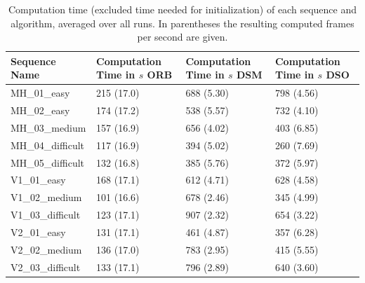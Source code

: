 	\begin{table}
	\caption{Computation time (excluded time needed for initialization) of each sequence and algorithm, averaged over all runs. In parentheses the 
	resulting computed frames per second are given.}
	\begin{tabular}{ |p{3cm}||p{3cm}|p{3cm}|p{3cm}|  }
	\hline
	Sequence Name & Computation Time in $s$ ORB & Computation Time in $s$ DSM & Computation Time in $s$ DSO \\
	\hline
	MH\_01\_easy & 215 (17.0) & 688 (5.30) & 798 (4.56)\\
	MH\_02\_easy & 174 (17.2) & 538 (5.57) & 732 (4.10)\\
	MH\_03\_medium & 157 (16.9) & 656 (4.02) & 403 (6.85)\\
	MH\_04\_difficult & 117 (16.9) & 394 (5.02) & 260 (7.69)\\
	MH\_05\_difficult & 132 (16.8) & 385 (5.76) & 372 (5.97)\\
	V1\_01\_easy & 168 (17.1) & 612 (4.71) & 628 (4.58)\\
	V1\_02\_medium & 101 (16.6) & 678 (2.46) & 345 (4.99)\\
	V1\_03\_difficult & 123 (17.1) & 907 (2.32) & 654 (3.22)\\
	V2\_01\_easy & 131 (17.1) & 461 (4.87) & 357 (6.28)\\
	V2\_02\_medium & 136 (17.0) & 783 (2.95) & 415 (5.55)\\
	V2\_03\_difficult & 133 (17.1) & 796 (2.89) & 640 (3.60)\\
	\hline
	\end{tabular}
	\label{table:comp_time}
	\end{table}

